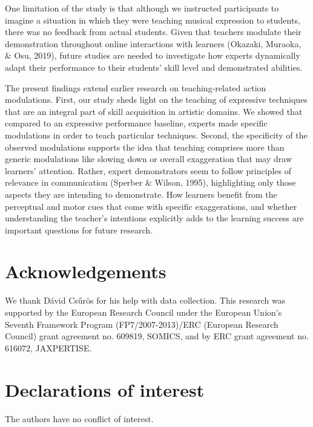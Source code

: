 \documentclass[
  english,
  man,floatsintext]{apa6}
\begin{document}
One limitation of the study is that although we instructed participants to imagine a situation in which they were teaching musical expression to students, there was no feedback from actual students. Given that teachers modulate their demonstration throughout online interactions with learners (Okazaki, Muraoka, \& Osu, 2019), future studies are needed to investigate how experts dynamically adapt their performance to their students' skill level and demonstrated abilities.

The present findings extend earlier research on teaching-related action modulations. First, our study sheds light on the teaching of expressive techniques that are an integral part of skill acquisition in artistic domains. We showed that compared to an expressive performance baseline, experts made specific modulations in order to teach particular techniques. Second, the specificity of the observed modulations supports the idea that teaching comprises more than generic modulations like slowing down or overall exaggeration that may draw learners' attention. Rather, expert demonstrators seem to follow principles of relevance in communication (Sperber \& Wilson, 1995), highlighting only those aspects they are intending to demonstrate. How learners benefit from the perceptual and motor cues that come with specific exaggerations, and whether understanding the teacher's intentions explicitly adds to the learning success are important questions for future research.

\hypertarget{acknowledgements}{%
\section{Acknowledgements}\label{acknowledgements}}

We thank Dávid Csűrös for his help with data collection. This research was supported by the European Research Council under the European Union's Seventh Framework Program (FP7/2007-2013)/ERC (European Research Council) grant agreement no. 609819, SOMICS, and by ERC grant agreement no. 616072, JAXPERTISE.

\hypertarget{declarations-of-interest}{%
\section{Declarations of interest}\label{declarations-of-interest}}

The authors have no conflict of interest.

\newpage
\end{document}
